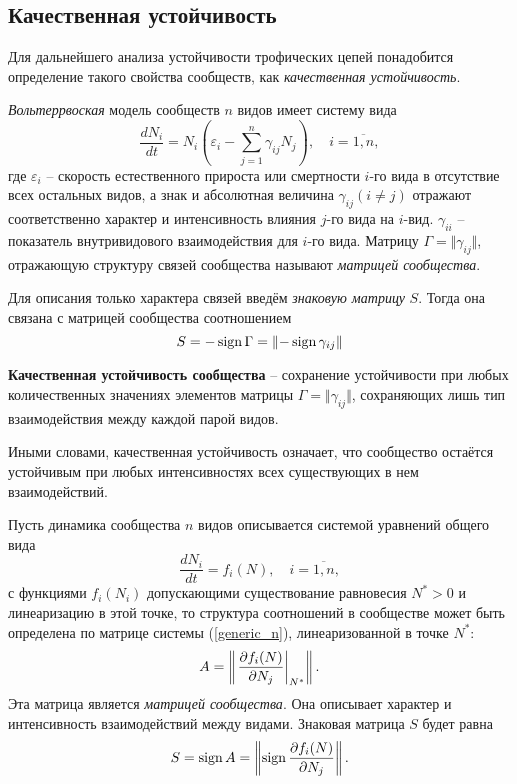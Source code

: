 \subsection{Качественная устойчивость}
    Для дальнейшего анализа устойчивости трофических цепей понадобится определение такого свойства сообществ, как \textit{качественная устойчивость}.

    \textit{Вольтеррвоская} модель сообществ \(n\) видов имеет систему вида
    \begin{equation}
        \frac{d N_i}{d t} = N_i \left( \varepsilon_i - \sum_{j=1}^{n} \gamma_{ij} N_j \right), \quad i=\overline{1,n},
    \end{equation}
    где \(\varepsilon_i\) -- скорость естественного прироста или смертности \(i\)-го вида в отсутствие всех остальных видов, а знак и абсолютная величина \(\gamma_{ij} (i \neq j)\) отражают соответственно характер и интенсивность влияния \(j\)-го вида на \(i\)-вид. \(\gamma_{ii}\) -- показатель внутривидового взаимодействия для \(i\)-го вида. Матрицу \(\Gamma = \Vert \gamma_{ij} \Vert\), отражающую структуру связей сообщества называют \textit{матрицей сообщества}.

    Для описания только характера связей введём \textit{знаковую матрицу} \(S\). Тогда она связана с матрицей сообщества соотношением 
    \[
        S = -\operatorname{sign} \Gamma = \left\Vert - \operatorname{sign} \gamma_{ij} \right\Vert
    \]

    \begin{definition}
        \textbf{Качественная устойчивость сообщества} -- сохранение устойчивости при любых количественных значениях элементов матрицы \(\Gamma = \Vert \gamma_{ij} \Vert\), сохраняющих лишь тип взаимодействия между каждой парой видов.
    \end{definition}

    Иными словами, качественная устойчивость означает, что сообщество остаётся устойчивым при любых интенсивностях  всех существующих в нем взаимодействий.

    Пусть динамика сообщества \(n\) видов описывается системой уравнений общего вида
    \begin{equation} \label{generic_n}
        \frac{d N_i}{d t} = f_i(N), \quad i = \overline{1,n},
    \end{equation}
    с функциями \(f_i (N_i)\) допускающими существование равновесия \(N^* > 0\) и линеаризацию в этой точке, то структура соотношений в сообществе может быть определена по матрице системы (\ref{generic_n}), линеаризованной в точке \(N^*\):
    \begin{equation}
        A = \left\Vert \left. \frac{\partial f_i (N)}{\partial N_j} \right|_{N^*} \right\Vert.
    \end{equation}
    Эта матрица является \textit{матрицей сообщества}. Она описывает характер и интенсивность взаимодействий между видами. Знаковая матрица \(S\) будет равна
    \begin{equation} \label{sign_partial}
        S = \operatorname{sign} A = \left\Vert \operatorname{sign} \frac{\partial f_i (N)}{\partial N_j} \right\Vert.
    \end{equation}

